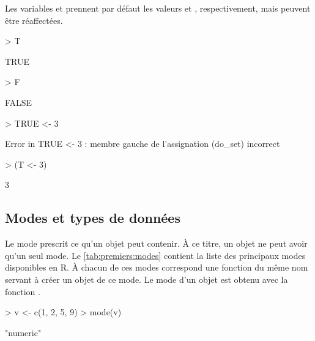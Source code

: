 Les variables  et
 prennent par défaut les
valeurs  et , respectivement, mais peuvent
être réaffectées.
\begin{Schunk}
\begin{Sinput}
> T
\end{Sinput}
\begin{Soutput}
[1] TRUE
\end{Soutput}
\begin{Sinput}
> F
\end{Sinput}
\begin{Soutput}
[1] FALSE
\end{Soutput}
\end{Schunk}
\begin{Schunk}
\begin{Sinput}
> TRUE <- 3
\end{Sinput}
\begin{Soutput}
Error in TRUE <- 3 : membre gauche de l'assignation
(do_set) incorrect
\end{Soutput}
\end{Schunk}
\begin{Schunk}
\begin{Sinput}
> (T <- 3)
\end{Sinput}
\begin{Soutput}
[1] 3
\end{Soutput}
\end{Schunk}



\subsection{Modes et types de données}
\label{sec:premiers:objets:mode}

Le mode prescrit ce qu'un objet peut contenir. À ce titre,
un objet ne peut avoir qu'un seul mode. Le \autoref{tab:premiers:modes}
contient la liste des principaux modes disponibles en R. À chacun de
ces modes correspond une fonction du même nom servant à créer un objet
de ce mode. Le mode d'un objet est obtenu avec la fonction
.
\begin{Schunk}
\begin{Sinput}
> v <- c(1, 2, 5, 9)
> mode(v)
\end{Sinput}
\begin{Soutput}
[1] "numeric"
\end{Soutput}
\end{Schunk}

